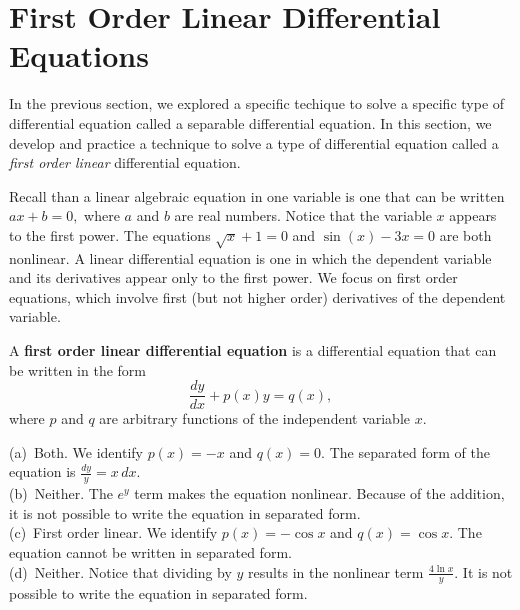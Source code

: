 
\section{First Order Linear Differential Equations}\label{sec:Linear}

In the previous section, we explored a specific techique to solve a specific type of differential equation called a separable differential equation.  In this section, we develop and practice a technique to solve a type of differential equation called a \emph{first order linear} differential equation.

Recall than a linear algebraic equation in one variable is one that can be written $ax + b = 0,$ where $a$ and $b$ are real numbers.  Notice that the variable $x$ appears to the first power.  The equations $\sqrt{x}+1=0$ and $\sin(x)-3x = 0$ are both nonlinear. A linear differential equation is one in which the dependent variable and its derivatives appear only to the first power.  We focus on first order equations, which involve first (but not higher order) derivatives of the dependent variable.

{A \textbf{first order linear differential equation} is a differential equation that can be written in the form
	\[
	\frac{dy}{dx} + p(x)y = q(x),
	\]
where $p$ and $q$ are arbitrary functions of the independent variable $x$.
}

{(a)\ Both.  We identify $p(x) = -x$ and $q(x) = 0.$  The separated form of the equation is $\displaystyle \frac{dy}{y} = x\,dx.$\\
(b)\ Neither.  The $e^y$ term makes the equation nonlinear.  Because of the addition, it is not possible to write the equation in separated form.\\
(c)\ First order linear.  We identify $p(x) = -\cos x$ and $q(x) = \cos x.$  The equation cannot be written in separated form.\\
(d)\ Neither.  Notice that dividing by $y$ results in the nonlinear term $\displaystyle \frac{4\ln x}{y}.$ It is not possible to write the equation in separated form.
}\\

